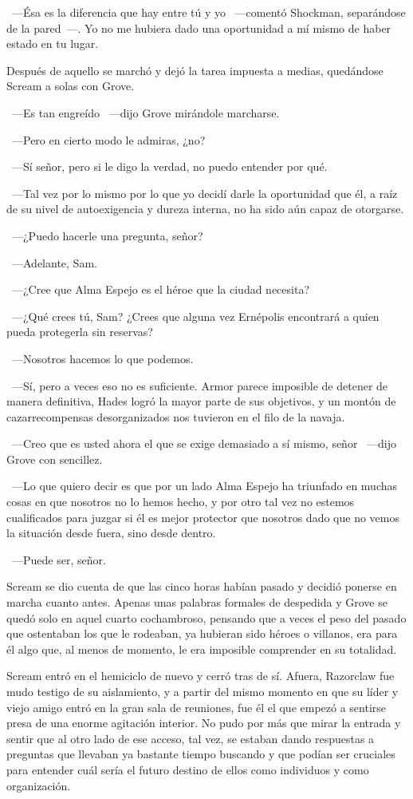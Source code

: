 ~---Ésa es la diferencia que hay entre tú y yo ~---comentó Shockman, separándose de la pared~---. Yo no me hubiera dado una oportunidad a mí mismo de haber estado en tu lugar.

Después de aquello se marchó y dejó la tarea impuesta a medias, quedándose Scream a solas con Grove.

~---Es tan engreído ~---dijo Grove mirándole marcharse.

~---Pero en cierto modo le admiras, ¿no?

~---Sí señor, pero si le digo la verdad, no puedo entender por qué.

~---Tal vez por lo mismo por lo que yo decidí darle la oportunidad que él, a raíz de su nivel de autoexigencia y dureza interna, no ha sido aún capaz de otorgarse.

~---¿Puedo hacerle una pregunta, señor?

~---Adelante, Sam.

~---¿Cree que Alma Espejo es el héroe que la ciudad necesita?

~---¿Qué crees tú, Sam? ¿Crees que alguna vez Ernépolis encontrará a quien pueda protegerla sin reservas?

~---Nosotros hacemos lo que podemos.

~---Sí, pero a veces eso no es suficiente. Armor parece imposible de detener de manera definitiva, Hades logró la mayor parte de sus objetivos, y un montón de cazarrecompensas desorganizados nos tuvieron en el filo de la navaja.

~---Creo que es usted ahora el que se exige demasiado a sí mismo, señor ~---dijo Grove con sencillez.

~---Lo que quiero decir es que por un lado Alma Espejo ha triunfado en muchas cosas en que nosotros no lo hemos hecho, y por otro tal vez no estemos cualificados para juzgar si él es mejor protector que nosotros dado que no vemos la situación desde fuera, sino desde dentro.

~---Puede ser, señor.

Scream se dio cuenta de que las cinco horas habían pasado y decidió ponerse en marcha cuanto antes. Apenas unas palabras formales de despedida y Grove se quedó solo en aquel cuarto cochambroso, pensando que a veces el peso del pasado que ostentaban los que le rodeaban, ya hubieran sido héroes o villanos, era para él algo que, al menos de momento, le era imposible comprender en su totalidad.

\parbreak
Scream entró en el hemiciclo de nuevo y cerró tras de sí. Afuera, Razorclaw fue mudo testigo de su aislamiento, y a partir del mismo momento en que su líder y viejo amigo entró en la gran sala de reuniones, fue él el que empezó a sentirse presa de una enorme agitación interior. No pudo por más que mirar la entrada y sentir que al otro lado de ese acceso, tal vez, se estaban dando respuestas a preguntas que llevaban ya bastante tiempo buscando y que podían ser cruciales para entender cuál sería el futuro destino de ellos como individuos y como organización.

